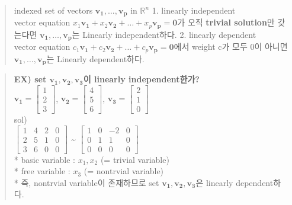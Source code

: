 \documentclass[11pt]{article}
\begin{document}
\begin{quote}
indexed set of vectors \({\mathbf{v_{1}}, \dots, \mathbf{v_{p}}}\) in
\(\mathbb{R}^n\) 1. linearly independent\\
vector equation
\(x_{1}\mathbf{v_{1}} + x_{2}\mathbf{v_{2}} + \dots + x_{p}\mathbf{v_{p}} = \mathbf{0}\)가
오직 \textbf{trivial solution}만 갖는다면
\({\mathbf{v_{1}}, \dots, \mathbf{v_{p}}}\)는 Linearly independent하다.
2. linearly dependent\\
vector equation
\(c_{1}\mathbf{v_{1}} + c_{2}\mathbf{v_{2}} + \dots + c_{p}\mathbf{v_{p}} = \mathbf{0}\)에서
weight c가 모두 0이 아니면 \({\mathbf{v_{1}}, \dots, \mathbf{v_{p}}}\)는
Linearly dependent하다.
\end{quote}

\begin{quote}
\textbf{EX) set \({\mathbf{v_{1}, v_{2}, v_{3}}}\)이 linearly
independent한가?}\\
\(\mathbf{v_{1}} = \begin{bmatrix} 1 \\ 2 \\ 3 \end{bmatrix}\),
\(\mathbf{v_{2}} = \begin{bmatrix} 4 \\ 5 \\ 6 \end{bmatrix}\),
\(\mathbf{v_{3}} = \begin{bmatrix} 2 \\ 1 \\ 0 \end{bmatrix}\)\\
sol)\\
\(\begin{bmatrix} 1&4&2&0 \\ 2&5&1&0 \\ 3&6&0&0 \end{bmatrix}\)
\textbf{\textasciitilde{}}
\(\begin{bmatrix} 1&0&-2&0 \\ 0&1&1&0 \\ 0&0&0&0 \end{bmatrix}\)\\
* basic variable : \(x_{1}, x_{2}\) (= trivial variable)\\
* free variable : \(x_{3}\) (= nontrvial variable)\\
* 즉, nontrvial variable이 존재하므로 set
\({\mathbf{v_{1}, v_{2}, v_{3}}}\)은 linearly dependent하다.
\end{quote}
\end{document}
